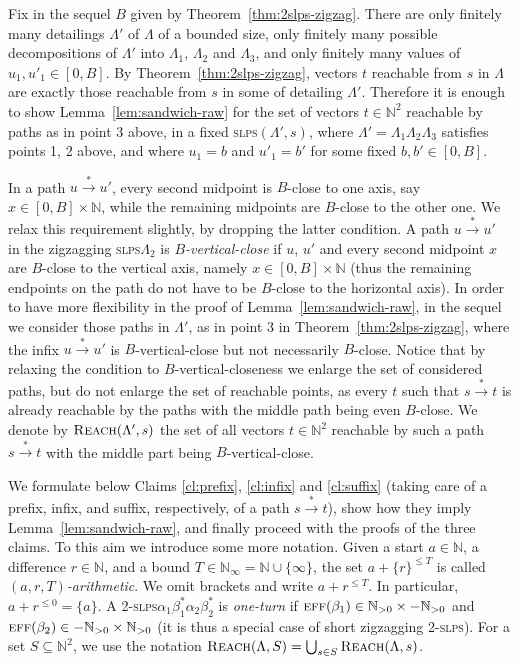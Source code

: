 \documentclass[a4paper, UKenglish, cleveref, autoref, thm-restate]{lipics-v2021}
\newcommand{\N}{\mathbb{N}}
\newcommand{\reach}{\textsc{Reach}}
\newcommand{\trans}[1]{\stackrel{#1}{\longrightarrow}}
\newcommand{\tran}{\trans{*}}
\newcommand{\slps}{\textsc{slps}\xspace}
\newcommand{\eff}{\textsc{eff}}
\newcommand{\dslps}{2-\slps}
\newcommand{\setfromto}[2]{[#1, #2]}
\newcommand{\Npos}{\N_{>0}}
\begin{document}
\begin{appendixproof}
Fix in the sequel $B$ given by Theorem~\ref{thm:2slps-zigzag}.
There are only finitely many detailings $\Lambda'$ of $\Lambda$ of a bounded size,
only finitely many possible decompositions of $\Lambda'$ into $\Lambda_1$, $\Lambda_2$ and $\Lambda_3$,
and only finitely many values of $u_1, u'_1\in\setfromto 0 B$.
By Theorem~\ref{thm:2slps-zigzag}, vectors $t$ reachable from $s$ in $\Lambda$ are exactly those
reachable from $s$ in some of detailing $\Lambda'$.
Therefore it is enough
to show Lemma~\ref{lem:sandwich-raw} for the set of vectors $t\in\N^2$ reachable by paths as in point 3 above,
in a fixed \slps $(\Lambda',s)$, where $\Lambda' = \Lambda_1 \Lambda_2 \Lambda_3$ satisfies points 1, 2 above,
and where $u_1 = b$ and $u'_1 = b'$ for some fixed $b,b'\in\setfromto 0 B$.

In a path $u\tran u'$, every second midpoint is $B$-close to one axis,
say $x\in \setfromto 0 B \times \N$,
while the remaining midpoints are $B$-close to the other one.
We relax this requirement slightly, by dropping the latter condition.
A path $u \tran u'$  in the zigzagging \slps $\Lambda_2$
is \emph{$B$-vertical-close} if $u$, $u'$ and every second midpoint $x$
are $B$-close to the vertical axis, namely $x \in \setfromto 0 B \times \N$
(thus the remaining endpoints on the path do not have to be $B$-close to the horizontal axis).
In order to have more flexibility in the proof of Lemma~\ref{lem:sandwich-raw},
in the sequel we consider those paths in $\Lambda'$, as in point 3 in Theorem~\ref{thm:2slps-zigzag}, where the infix
$u\tran u'$ is $B$-vertical-close but not necessarily $B$-close.
Notice that by relaxing the condition to $B$-vertical-closeness
we enlarge the set of considered paths, but do not enlarge the set of reachable points,
as every $t$ such that $s \tran t$ is already reachable by the paths with the middle path being even $B$-close.
We denote by $\reach(\Lambda', s)$ the set of all vectors $t\in\N^2$ reachable by such a path $s\tran t$ with
the middle part being $B$-vertical-close.

We formulate below Claims \ref{cl:prefix}, \ref{cl:infix} and \ref{cl:suffix}
(taking care of a prefix, infix, and suffix, respectively, of a path $s\tran t$), 
show how they imply Lemma~\ref{lem:sandwich-raw}, and finally proceed with the proofs of the three claims.
To this aim we introduce some more notation.
Given a start $a \in \N$, a difference $r \in \N$, and a bound $T \in \N_\infty = \N\cup\{\infty\}$,
the set $a + \{r\}^{\leq T}$ is called \emph{$(a, r, T)$-arithmetic}. 
We omit brackets and write $a + r^{\leq T}$.
In particular, $a + r^{\leq 0} = \{a\}$.
A \dslps  $\alpha_1 \beta_1^* \alpha_2 \beta_2^*$ is \emph{one-turn} if 
$\eff(\beta_1) \in \Npos  \times -\Npos$ and $\eff(\beta_2) \in -\Npos  \times \Npos$
(it is thus a special case of short zigzagging \dslps).
For a set $S\subseteq \N^2$, we use the notation $\reach(\Lambda, S) = \bigcup_{s\in S} \reach(\Lambda, s)$.


\end{appendixproof}
\end{document}
